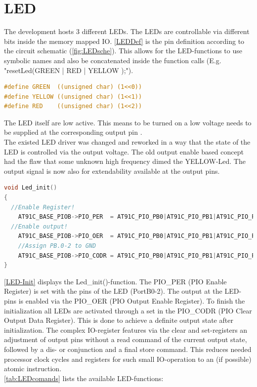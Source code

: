 \section{LED}
\label{sec:LED}
The development hosts 3 different LEDs. The LEDs are controllable via different bits inside the memory mapped IO. \autoref{LEDDef} is the pin definition according to the circuit schematic (\autoref{fig:LEDsche}). This allows for the LED-functions to use symbolic names and also be concatenated inside the function calls (E.g. "resetLed(GREEN | RED | YELLOW );").\\

\begin{lstlisting}[language=C, caption={Color definition for the LED-functions}, label={LEDDef}]
#define GREEN  ((unsigned char) (1<<0))
#define YELLOW ((unsigned char) (1<<1))
#define RED    ((unsigned char) (1<<2))
\end{lstlisting}

The LED itself are low active. This means to be turned on a low voltage needs to be supplied at the corresponding output pin \cite{AT91LED}.\\
The existed LED driver was changed and reworked in a way that the state of the LED is controlled via the output voltage. The old output enable based concept had the flaw that some unknown high frequency dimed the YELLOW-Led. The output signal is now also for extendability available at the output pins.
\begin{lstlisting}[language=C, caption={Configure the LED-Pins as output}, label={LED-Init}]
void Led_init()
{	
  //Enable Register!                                                    
	AT91C_BASE_PIOB->PIO_PER  = AT91C_PIO_PB0|AT91C_PIO_PB1|AT91C_PIO_PB2;
  //Enable output!
	AT91C_BASE_PIOB->PIO_OER  = AT91C_PIO_PB0|AT91C_PIO_PB1|AT91C_PIO_PB2; 
	//Assign PB.0-2 to GND
	AT91C_BASE_PIOB->PIO_CODR = AT91C_PIO_PB0|AT91C_PIO_PB1|AT91C_PIO_PB2; 
}
\end{lstlisting}
\autoref{LED-Init} displays the Led\_init()-function. The \acs{PIO}\_PER (\acs{PIO} Enable Register) is set with the pins of the LED (PortB0-2). The output at the LED-pins is enabled via the \acs{PIO}\_OER (\acs{PIO} Output Enable Register). To finish the initialization all LEDs are activated through a set in the \acs{PIO}\_CODR (\acs{PIO} Clear Output Data Register). This is done to achieve a definite output state after initialization. The complex IO-register features via the clear and set-registers an adjustment of output pins without a read command of the current output state, followed by a dis- or conjunction and a final store command. This reduces needed processor clock cycles and registers for such small IO-operation to an (if possible) atomic instruction.\\
\autoref{tab:LEDcomands} lists the available LED-functions:

